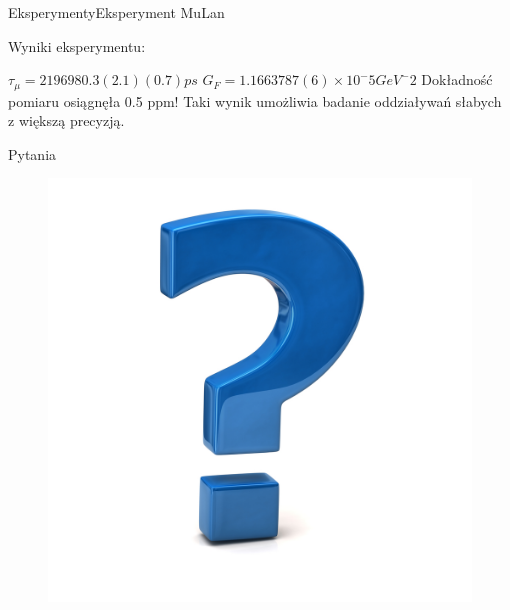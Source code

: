 \documentclass[xcolor={dvipsnames}]{beamer}
\begin{document}
\begin{frame}{Eksperymenty}{Eksperyment MuLan}

    Wyniki eksperymentu:

    \begin{outline}[enumerate]
        \1 $\tau_\mu = 2 196 980.3  (2.1) (0.7) ps$
        \1 $G_F = 1.166 3787(6) \times 10^-5 GeV^-2$
        \1 Dokładność pomiaru osiągnęła 0.5 ppm!
        \1 Taki wynik umożliwia badanie oddziaływań słabych z większą precyzją.
    \end{outline}

\end{frame}

\begin{frame}{Pytania}
    
    \begin{figure}
        \includegraphics[scale=1]{questions.JPG}
    \end{figure}

\end{frame}
\end{document}
